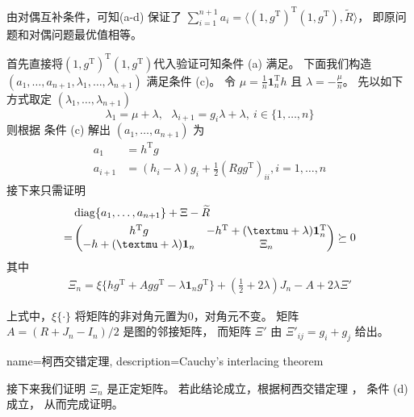 由对偶互补条件，可知(a-d) 保证了 
$\sum_{i=1}^{n+1} a_i=\langle (1,g^{\mathrm{T}})^{\mathrm{T}}(1,g^{\mathrm{T}}),\widetilde{R} \rangle$，
即原问题和对偶问题最优值相等。

首先直接将$(1,g^{\mathrm{T}})^{\mathrm{T}}(1,g^{\mathrm{T}})$代入验证可知条件 (a) 满足。
下面我们构造  $(a_1,\ldots,a_{n+1},\lambda_1,\ldots,\lambda_{n+1})$  满足条件 (c)。
令 $\mu=\frac{1}{n}\mathbf{1}_n^{\mathrm{T}} h$ 且
$\lambda = -\frac{\mu}{n}$。 先以如下方式取定 $(\lambda_1,\ldots,\lambda_{n+1})$
$$
\lambda_1=\mu+\lambda, \text{  }\lambda_{i+1}=g_i\lambda + \lambda,~i\in\{1,\ldots,n\}
$$
则根据 条件 (c) 解出 $(a_1, \dots, a_{n+1})$ 为
\begin{align}
    a_1 &= h^{\mathrm{T}} g \nonumber\\
    a_{i+1} & = (h_i -\lambda)g_i  + \frac{1}{2}(Rgg^{\mathrm{T}})_{ii}, i = 1, \dots, n
\end{align}
接下来只需证明
\begin{align}
    &\diag\{a_1, \dots, a_{n+1}\} + \Xi - \widetilde{R} \nonumber\\
    =& \begin{pmatrix} h^{\mathrm{T}} g & -h^{\mathrm{T}} +(\mu + \lambda)\mathbf{1}_n^{\mathrm{T}} \\
        -h+(\mu + \lambda )\mathbf{1}_n & \Xi_n \end{pmatrix}
    \succeq 0
\end{align}
其中
\begin{align}\label{eq:Xi_n}
    \Xi_n =\xi\{hg^{\mathrm{T}} + Agg^{\mathrm{T}} -\lambda \mathbf{1}_ng^{\mathrm{T}}\}
    + \left(\frac{1}{2} +2\lambda \right)
    J_n  - A + 2\lambda \Xi'
\end{align}

上式中，$\xi\{\cdot\}$ 将矩阵的非对角元置为0，对角元不变。
矩阵 $A=(R+J_n-I_n)/2$ 是图的邻接矩阵，
而矩阵 $\Xi'$ 由 $\Xi'_{ij}=g_i + g_j$ 给出。

{name=柯西交错定理,
description={Cauchy's interlacing theorem}}

接下来我们证明 $\Xi_n$ 是正定矩阵。
若此结论成立，根据柯西交错定理 \cite{hwang}，
条件 (d) 成立，
从而完成证明。

